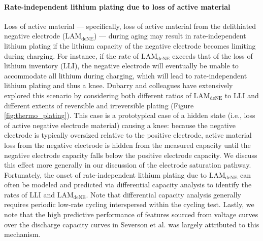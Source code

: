 \documentclass[journal=jpclcd,manuscript=article]{achemso}
\begin{document}
\paragraph{Rate-independent lithium plating due to loss of active material}

Loss of active material --- specifically, loss of active material from the delithiated negative electrode ($\mathrm{LAM_{deNE}}$) --- during aging may result in rate-independent lithium plating if the lithium capacity of the negative electrode becomes limiting during charging. For instance, if the rate of $\mathrm{LAM_{deNE}}$ exceeds that of the loss of lithium inventory (LLI), the negative electrode will eventually be unable to accommodate all lithium during charging, which will lead to rate-independent lithium plating and thus a knee. Dubarry and colleagues\cite{ansean_operando_2017, dubarry_durability_2018, baure_synthetic_2019, dubarry_big_2020} have extensively explored this scenario by considering both different ratios of $\mathrm{LAM_{deNE}}$ to LLI and different extents of reversible and irreversible plating (Figure \ref{fig:thermo_plating}). This case is a prototypical case of a hidden state (i.e., loss of active negative electrode material) causing a knee: because the negative electrode is typically oversized relative to the positive electrode, active material loss from the negative electrode is hidden from the measured capacity until the negative electrode capacity falls below the positive electrode capacity. We discuss this effect more generally in our discussion of the electrode saturation pathway. Fortunately, the onset of rate-independent lithium plating due to $\mathrm{LAM_{deNE}}$ can often be modeled and predicted via differential capacity analysis\cite{ansean_operando_2017, dubarry_durability_2018, baure_synthetic_2019, dubarry_big_2020} to identify the rates of LLI and $\mathrm{LAM_{deNE}}$. Note that differential capacity analysis generally requires periodic low-rate cycling interspersed within the cycling test.
Lastly, we note that the high predictive performance of features sourced from voltage curves over the discharge capacity curves in Severson et al.\cite{severson_data-driven_2019} was largely attributed to this mechanism.
\end{document}
